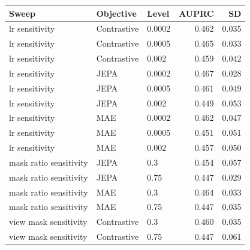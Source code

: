 \begin{tabular}{lllrr}
\toprule
Sweep & Objective & Level & AUPRC & SD \\
\midrule
lr sensitivity & Contrastive & 0.0002 & 0.462 & 0.035 \\
lr sensitivity & Contrastive & 0.0005 & 0.465 & 0.033 \\
lr sensitivity & Contrastive & 0.002 & 0.459 & 0.042 \\
lr sensitivity & JEPA & 0.0002 & 0.467 & 0.028 \\
lr sensitivity & JEPA & 0.0005 & 0.461 & 0.049 \\
lr sensitivity & JEPA & 0.002 & 0.449 & 0.053 \\
lr sensitivity & MAE & 0.0002 & 0.462 & 0.047 \\
lr sensitivity & MAE & 0.0005 & 0.451 & 0.051 \\
lr sensitivity & MAE & 0.002 & 0.457 & 0.050 \\
mask ratio sensitivity & JEPA & 0.3 & 0.454 & 0.057 \\
mask ratio sensitivity & JEPA & 0.75 & 0.447 & 0.029 \\
mask ratio sensitivity & MAE & 0.3 & 0.464 & 0.033 \\
mask ratio sensitivity & MAE & 0.75 & 0.447 & 0.035 \\
view mask sensitivity & Contrastive & 0.3 & 0.460 & 0.035 \\
view mask sensitivity & Contrastive & 0.75 & 0.447 & 0.061 \\
\bottomrule
\end{tabular}
